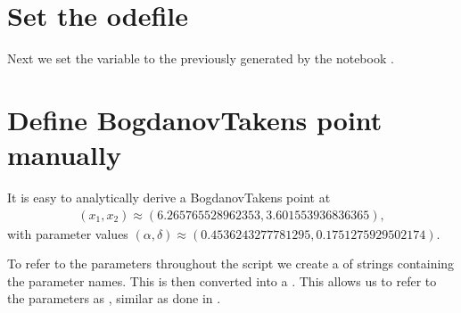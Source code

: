 \documentclass[letterpaper,10pt,english]{jupyterBook}
\begin{document}
\section{Set the odefile}
\label{\detokenize{Bazykin:set-the-odefile}}
\sphinxAtStartPar
Next we set the variable  to the  previously generated by
the notebook {\hyperref[\detokenize{BazykinGenSym::doc}]{}}.

\begin{sphinxVerbatim}[commandchars=\\\{\}]
\end{sphinxVerbatim}


\section{Define Bogdanov\sphinxhyphen{}Takens point manually}
\label{\detokenize{Bazykin:define-bogdanov-takens-point-manually}}
\sphinxAtStartPar
It is easy to analytically derive a Bogdanov\sphinxhyphen{}Takens point at
\begin{equation*}
\begin{split}(x_1, x_2) \approx (6.265765528962353, 3.601553936836365),\end{split}
\end{equation*}
\sphinxAtStartPar
with parameter values \((\alpha, \delta) \approx (0.4536243277781295, 0.1751275929502174)\).

\begin{sphinxVerbatim}[commandchars=\\\{\}]
\PYG{p}{[}\PYG{p}{]}
\PYG{p}{[}\PYG{p}{]}
\end{sphinxVerbatim}

\sphinxAtStartPar
To refer to the parameters throughout the script we create a  of
strings containing the parameter names. This is then converted into a
. This allows us to refer to the parameters as ,
similar as done in .
\end{document}
